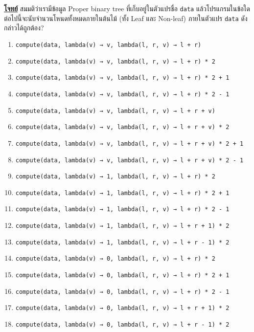 \noindent%
\textbf{\uline{โจทย์}}\; สมมติว่าเรามีข้อมูล Proper binary tree ที่เก็บอยู่ในตัวแปรชื่อ \lstinline{data}
แล้วโปรแกรมในข้อใดต่อไปนี้จะนับจำนวนโหนดทั้งหมดภายในต้นไม้ (ทั้ง Leaf และ Non-leaf) 
ภายในตัวแปร \lstinline{data} ดังกล่าวได้ถูกต้อง?\hrsp%

\begin{fullwidth}
\bigskip
\begin{enumerate}[label={$\Circle$}]
    \item \lstinline{compute(data, lambda(v) → v, lambda(l, r, v) → l + r)}
    \item \lstinline{compute(data, lambda(v) → v, lambda(l, r, v) → l + r) * 2}
    \item \lstinline{compute(data, lambda(v) → v, lambda(l, r, v) → l + r) * 2 + 1}
    \item \lstinline{compute(data, lambda(v) → v, lambda(l, r, v) → l + r) * 2 - 1}
    \item \lstinline{compute(data, lambda(v) → v, lambda(l, r, v) → l + r + v)}
    \item \lstinline{compute(data, lambda(v) → v, lambda(l, r, v) → l + r + v) * 2}
    \item \lstinline{compute(data, lambda(v) → v, lambda(l, r, v) → l + r + v) * 2 + 1}
    \item \lstinline{compute(data, lambda(v) → v, lambda(l, r, v) → l + r + v) * 2 - 1}
    \item \lstinline{compute(data, lambda(v) → 1, lambda(l, r, v) → l + r) * 2}
    \item \lstinline{compute(data, lambda(v) → 1, lambda(l, r, v) → l + r) * 2 + 1}
    \item \lstinline{compute(data, lambda(v) → 1, lambda(l, r, v) → l + r) * 2 - 1}
    \item \lstinline{compute(data, lambda(v) → 1, lambda(l, r, v) → l + r + 1) * 2}
    \item \lstinline{compute(data, lambda(v) → 1, lambda(l, r, v) → l + r - 1) * 2}
    \item \lstinline{compute(data, lambda(v) → 0, lambda(l, r, v) → l + r) * 2}
    \item \lstinline{compute(data, lambda(v) → 0, lambda(l, r, v) → l + r) * 2 + 1}
    \item \lstinline{compute(data, lambda(v) → 0, lambda(l, r, v) → l + r) * 2 - 1}
    \item \lstinline{compute(data, lambda(v) → 0, lambda(l, r, v) → l + r + 1) * 2}
    \item \lstinline{compute(data, lambda(v) → 0, lambda(l, r, v) → l + r - 1) * 2}
\end{enumerate}
\end{fullwidth}
